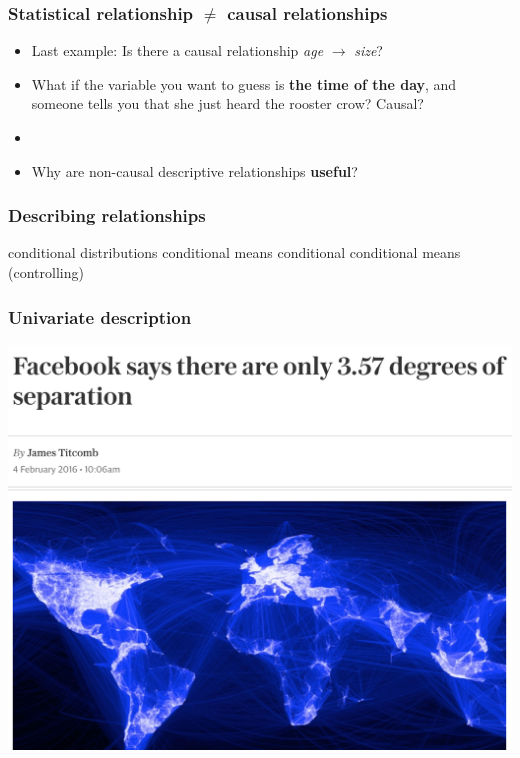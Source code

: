 \documentclass[aspectratio=43]{beamer}
\begin{document}
\begin{frame}
\frametitle{Statistical relationship $\neq$ causal relationships}
\centering

\begin{itemize}
  \item<1-> Last example: Is there a causal relationship \textit{age} $\rightarrow$ \textit{size}?
  \item<2-> What if the variable you want to guess is \textbf{the time of the day}, and someone tells you that she just heard the rooster crow? Causal?
  \item[]
  \item<3-> Why are non-causal descriptive relationships \textbf{useful}?
\end{itemize}

\end{frame}

\begin{frame}
\frametitle{Describing relationships}
\centering

conditional distributions
conditional means
conditional conditional means (controlling)

\end{frame}

\begin{frame}
\frametitle{Univariate description}
\centering

\includegraphics[width = \textwidth]{../img/sixdegrees}

\end{frame}
\end{document}
